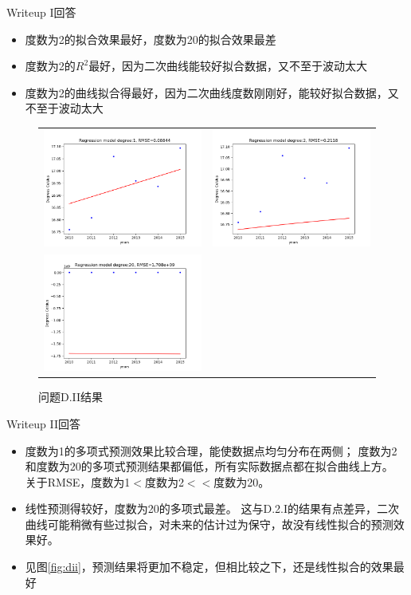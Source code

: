 \documentclass[logo,reportComp]{thesis}
\begin{document}
Writeup I回答
\begin{itemize}
	\item 度数为2的拟合效果最好，度数为20的拟合效果最差
	\item 度数为2的$R^2$最好，因为二次曲线能较好拟合数据，又不至于波动太大
	\item 度数为2的曲线拟合得最好，因为二次曲线度数刚刚好，能较好拟合数据，又不至于波动太大
\end{itemize}

\begin{figure}[H]
\centering
\begin{tabular}{cc}
\includegraphics[width=0.5\linewidth]{fig/DII-1.png}&
\includegraphics[width=0.5\linewidth]{fig/DII-2.png}\\
\includegraphics[width=0.5\linewidth]{fig/DII-3.png}
\end{tabular}
\caption{问题D.II结果}
\end{figure}

Writeup II回答
\begin{itemize}
	\item 度数为1的多项式预测效果比较合理，能使数据点均匀分布在两侧；
	度数为2和度数为20的多项式预测结果都偏低，所有实际数据点都在拟合曲线上方。
	关于RMSE，度数为1$<$度数为2$<<$度数为20。
	\item 线性预测得较好，度数为20的多项式最差。
	这与D.2.I的结果有点差异，二次曲线可能稍微有些过拟合，对未来的估计过为保守，故没有线性拟合的预测效果好。
	\item 见图\ref{fig:dii}，预测结果将更加不稳定，但相比较之下，还是线性拟合的效果最好
\end{itemize}
\end{document}
